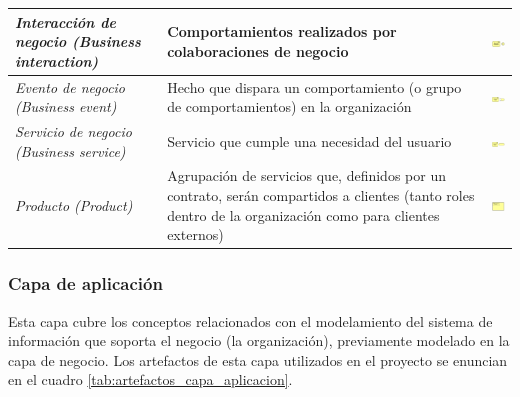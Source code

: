 \begin{center}
\begin{longtable}{|p{4cm}|p{6cm}|c|}
	\hline
	\textit{Interacción de negocio (Business interaction)} & 
    Comportamientos realizados por colaboraciones de negocio &  
    \includegraphics[width=1.5cm]{./imagenes/Archimate/artefactos/businessinteraction.png}\\
	\hline
	\textit{Evento de negocio (Business event)} & 
    Hecho que dispara un comportamiento (o grupo de comportamientos) en la organización &  
    \includegraphics[width=1.5cm]{./imagenes/Archimate/artefactos/businessevent.png}\\
	\hline
	\textit{Servicio de negocio (Business service)} & 
    Servicio que cumple una necesidad del usuario &  
    \includegraphics[width=1.5cm]{./imagenes/Archimate/artefactos/businessservice.png}\\
	\hline
	\textit{Producto (Product)} & 
    Agrupación de servicios que, definidos por un contrato, serán compartidos a clientes (tanto roles dentro de la organización como para clientes externos) &  
    \includegraphics[width=1.5cm]{./imagenes/Archimate/artefactos/businessproduct.png}\\
	\hline
  \end{longtable}
\end{center}

\subsubsection{Capa de aplicación} 

Esta capa cubre los conceptos relacionados con el modelamiento del sistema de información que soporta el negocio (la organización), previamente modelado en la capa de negocio. Los artefactos de esta capa utilizados en el proyecto se enuncian en el cuadro \ref{tab:artefactos_capa_aplicacion}.

